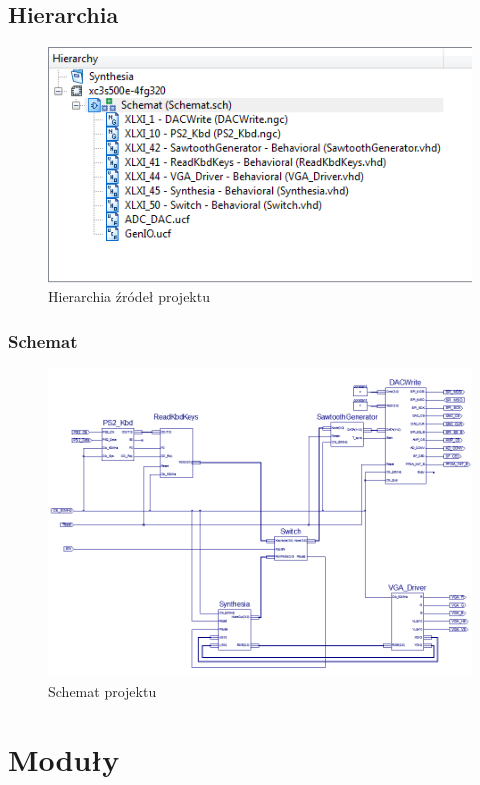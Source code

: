 \documentclass[a4paper]{report}
\begin{document}
	\section{Hierarchia}
		\begin{figure}[h!]
			\centering
			\includegraphics{hierarchy.png}
			\caption{Hierarchia źródeł projektu}
		\end{figure}
				
		\begin{landscape}
			\subsection{Schemat}
				\begin{figure}[h!]
					\centering
					\includegraphics[width=1.1\textwidth]{schemat.png}
					\caption{Schemat projektu}
				\end{figure}
		\end{landscape}

\chapter{Moduły}
\end{document}
